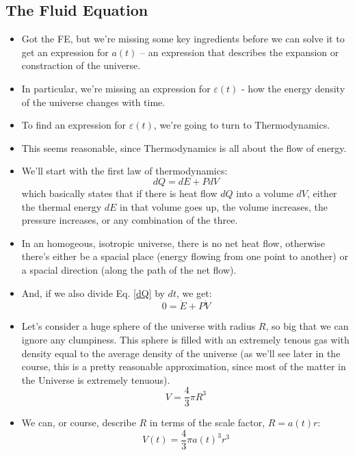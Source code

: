 \documentclass[11pt]{article}
\begin{document}
\subsection{The Fluid Equation}
\begin{itemize}
\item Got the FE, but we're missing some key ingredients before we can solve it to get an expression for $a(t)$ -- an expression that describes the expansion or constraction of the universe.
\item In particular, we're missing an expression for $\varepsilon(t)$ - how the energy density of the universe changes with time.
\item To find an expression for $\varepsilon(t)$, we're going to turn to Thermodynamics.
\item This seems reasonable, since Thermodynamics is all about the flow of energy.
\item We'll start with the first law of thermodynamics:
\begin{equation}
\label{dQ}
    dQ = dE + PdV
\end{equation}
which basically states that if there is heat flow $dQ$ into a volume $dV$, either the thermal energy $dE$ in that volume goes up, the volume increases, the pressure increases, or any combination of the three.
\item In an homogeous, isotropic universe, there is no net heat flow, otherwise there's either be a spacial place (energy flowing from one point to another) or a spacial direction (along the path of the net flow).
\item And, if we also divide Eq. \ref{dQ} by $dt$, we get:
\begin{equation}
\label{zero}
    0 = \dot{E}+P\dot{V}
\end{equation} 
\item Let's consider a huge sphere of the universe with radius $R$, so big that we can ignore any clumpiness. This sphere is filled with an extremely tenous gas with density equal to the average density of the universe (as we'll see later in the course, this is a pretty reasonable approximation, since most of the matter in the Universe is extremely tenuous).
\begin{equation}
V = \frac{4}{3}\pi R^3
\end{equation}
\item We can, or course, describe $R$ in terms of the scale factor, $R=a(t)r$:
\begin{equation}
    \label{Vt}
    V(t) = \frac{4}{3}\pi a(t)^3r^3

\end{equation}
\end{itemize}
\end{document}
